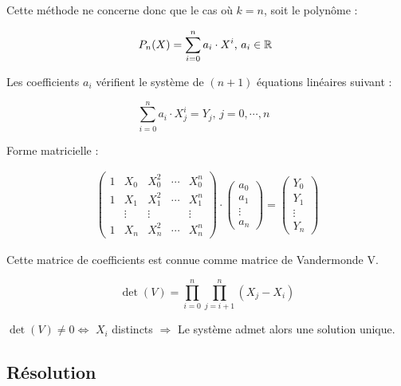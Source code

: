 \bigbreak
\bigbreak
Cette méthode ne concerne donc que le cas o\`u $k = n$, soit le polynôme :

\begin{equation}
    P_n(X) = \sum_{i = 0}^n a_i \cdot X^i \text{, $a_i \in \mathbb{R}$ }
\end{equation}

Les coefficients $a_i$ vérifient le système de $(n + 1)$ équations linéaires suivant :

\begin{equation}
    \sum_{i = 0}^n a_i \cdot X_j^i = Y_j \text{, $j = 0,\cdots,n$ }
\end{equation}


Forme matricielle :

\[
    \begin{array}{cc}
        \begin{pmatrix}
            1 & X_0 & X_0^2 & \cdots & X_0^n\\
            1 & X_1 & X_1^2 & \cdots & X_1^n\\
            & \vdots & \vdots & & \vdots\\
            1 & X_n & X_n^2 & \cdots & X_n^n
        \end{pmatrix}
        \cdot
        \begin{pmatrix}
            a_0\\
            a_1\\
            \vdots\\
            a_n
        \end{pmatrix}
        =
        \begin{pmatrix}
            Y_0\\
            Y_1\\
            \vdots\\
            Y_n
        \end{pmatrix}
    \end{array}
\]

Cette matrice de coefficients est connue comme matrice de Vandermonde V.


\begin{equation}
    \det(V) = \prod_{i = 0}^n \prod_{j = i + 1}^n (X_j - X_i)
\end{equation}

$\det(V) \ne 0 \Leftrightarrow$ $X_i$ distincts
\newline
\newline
$\Rightarrow$ Le système admet alors une solution unique.


\subsection* {Résolution}

